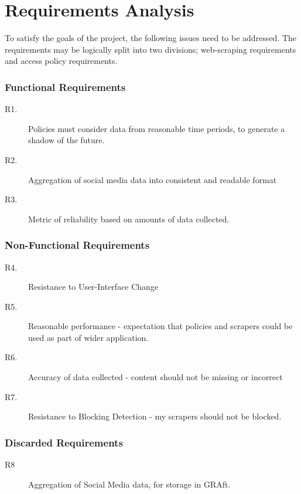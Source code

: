 \chapter{Requirements Analysis}\label{C:us}

To satisfy the goals of the project, the following issues need to be addressed. The requirements may be logically split into two divisions; web-scraping requirements and access policy requirements.

\subsection{Functional Requirements}

\begin{description}
 \item  [R1.] Policies must consider data from reasonable time periods, to generate a shadow of the future.
 \item [R2.] Aggregation of social media data into consistent and readable format
 \item [R3.] Metric of reliability based on amounts of data collected.
\end{description}

\subsection{Non-Functional Requirements}

\begin{description}
 \item [R4.] Resistance to User-Interface Change
 \item [R5.] Reasonable performance - expectation that policies and scrapers could be used as part of wider application.
 \item [R6.] Accuracy of data collected - content should not be missing or incorrect
 \item [R7.] Resistance to Blocking Detection - my scrapers should not be blocked.
\end{description}

\subsection{Discarded Requirements}

\begin{description}
 \item [R8] Aggregation of Social Media data, for storage in GRAft.
\end{description}


